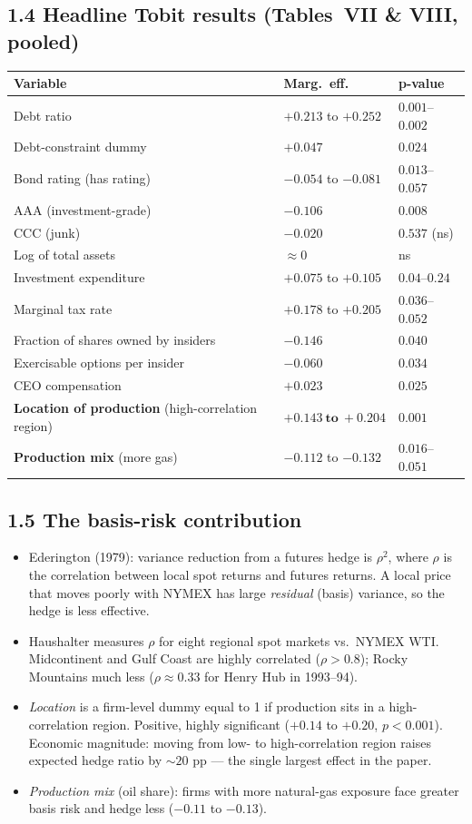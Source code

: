 \documentclass[11pt]{article}
\begin{document}
\subsection*{1.4 Headline Tobit results (Tables~VII \& VIII, pooled)}
\begin{tabular}{p{6.5cm}p{2.3cm}p{1.5cm}}
\toprule
\textbf{Variable} & \textbf{Marg.\ eff.} & \textbf{p-value} \\
\midrule
Debt ratio & $+0.213$ to $+0.252$ & $0.001$--$0.002$ \\
Debt-constraint dummy & $+0.047$ & $0.024$ \\
Bond rating (has rating) & $-0.054$ to $-0.081$ & $0.013$--$0.057$ \\
AAA (investment-grade) & $-0.106$ & $0.008$ \\
CCC (junk) & $-0.020$ & $0.537$ (ns) \\
Log of total assets & $\approx 0$ & ns \\
Investment expenditure & $+0.075$ to $+0.105$ & $0.04$--$0.24$ \\
Marginal tax rate & $+0.178$ to $+0.205$ & $0.036$--$0.052$ \\
Fraction of shares owned by insiders & $-0.146$ & $0.040$ \\
Exercisable options per insider & $-0.060$ & $0.034$ \\
CEO compensation & $+0.023$ & $0.025$ \\
\textbf{Location of production} (high-correlation region) & $\mathbf{+0.143\ to\ +0.204}$ & $\mathbf{0.001}$ \\
\textbf{Production mix} (more gas) & $-0.112$ to $-0.132$ & $0.016$--$0.051$ \\
\bottomrule
\end{tabular}

\subsection*{1.5 The basis-risk contribution}
\begin{itemize}
\item Ederington (1979): variance reduction from a futures hedge is $\rho^2$, where $\rho$ is the correlation between local spot returns and futures returns. A local price that moves poorly with NYMEX has large \emph{residual} (basis) variance, so the hedge is less effective.
\item Haushalter measures $\rho$ for eight regional spot markets vs.\ NYMEX WTI. Midcontinent and Gulf Coast are highly correlated ($\rho > 0.8$); Rocky Mountains much less ($\rho \approx 0.33$ for Henry Hub in 1993--94).
\item \emph{Location} is a firm-level dummy equal to 1 if production sits in a high-correlation region. Positive, highly significant ($+0.14$ to $+0.20$, $p<0.001$). Economic magnitude: moving from low- to high-correlation region raises expected hedge ratio by $\sim 20$ pp --- the single largest effect in the paper.
\item \emph{Production mix} (oil share): firms with more natural-gas exposure face greater basis risk and hedge less ($-0.11$ to $-0.13$).
\end{itemize}
\end{document}
